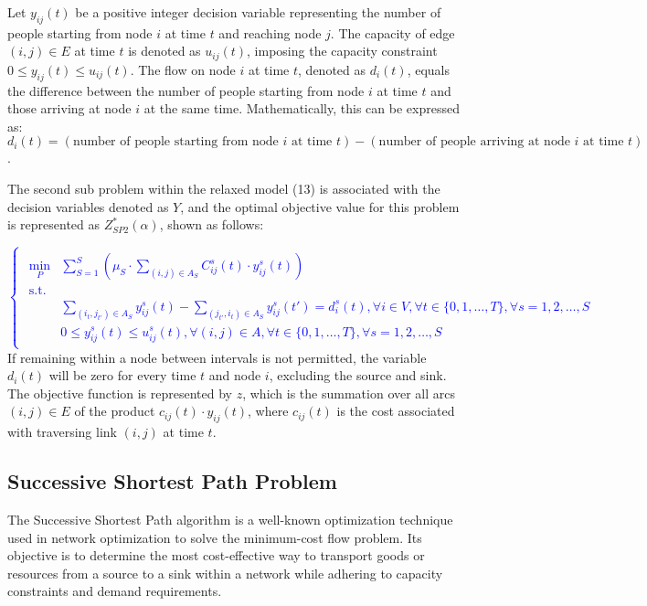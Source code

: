 \documentclass[a4paper]{article}
\begin{document}
		Let \(y_{ij}(t)\) be a positive integer decision variable representing the number of people starting from node \(i\) at time \(t\) and reaching node \(j\). The capacity of edge \((i, j) \in E\) at time \(t\) is denoted as \(u_{ij}(t)\), imposing the capacity constraint \(0 \leq y_{ij}(t) \leq u_{ij}(t)\). The flow on node \(i\) at time \(t\), denoted as \(d_i(t)\), equals the difference between the number of people starting from node \(i\) at time \(t\) and those arriving at node \(i\) at the same time. Mathematically, this can be expressed as: \(d_i(t) = (\text{{number of people starting from node }} i \text{{ at time }} t) - (\text{{number of people arriving at node }} i \text{{ at time }} t)\).
		
		The second sub problem within the relaxed model (13) is associated with the decision variables denoted as \(Y\), and the optimal objective value for this problem is represented as \(Z_{SP2}^*(\alpha)\), shown as follows:
		
		\textcolor{blue}{\[
			
			\begin{cases}
				\begin{aligned}
					\min_{P} & \sum_{S=1}^{S} \left(\mu_{S} \cdot \sum_{(i,j) \in A_S} C_{ij}^{s}(t) \cdot y_{ij}^{s}(t)\right) \\
					\text{s.t.} & \\
					& \sum_{(i_t,j_{t'}) \in A_S} y_{ij}^{s}(t) - \sum_{(j_{t'},i_t) \in A_S} y_{ij}^{s}(t') = d_i^s(t), \forall i \in V, \forall t \in \{0,1,\ldots,T\}, \forall s=1,2,\ldots,S \\
					& 0 \leq y_{ij}^{s}(t) \leq u_{ij}^{s}(t), \forall (i,j) \in A, \forall t \in \{0,1,\ldots,T\}, \forall s=1,2,\ldots,S
					
				\end{aligned}
			\end{cases}
			\]
		}
		If remaining within a node between intervals is not permitted, the variable \(d_i(t)\) will be zero for every time \(t\) and node \(i\), excluding the source and sink. The objective function is represented by \(z\), which is the summation over all arcs \((i, j) \in E\) of the product \(c_{ij}(t) \cdot y_{ij}(t)\), where \(c_{ij}(t)\) is the cost associated with traversing link \((i, j)\) at time \(t\).\\
		\subsection{Successive Shortest Path Problem}
		The Successive Shortest Path algorithm is a well-known optimization technique used in network optimization to solve the minimum-cost flow problem. Its objective is to determine the most cost-effective way to transport goods or resources from a source to a sink within a network while adhering to capacity constraints and demand requirements.
		
\end{document}
